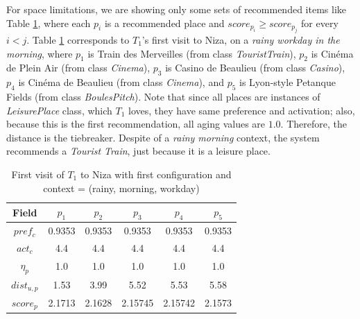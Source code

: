 

For space limitations, we are showing only some sets of recommended items like Table \ref{table:t1-1}, where each $p_i$ is a recommended place and $score_{p_i} \ge score_{p_j}$ for every $i < j$. Table \ref{table:t1-1} corresponds to $T_1$'s first visit to Niza, on a {\it rainy workday in the morning}, where $p_1$ is Train des Merveilles (from class \textit{TouristTrain}), $p_2$ is Cinéma de Plein Air (from class \textit{Cinema}), $p_3$ is Casino de Beaulieu (from class \textit{Casino}), $p_4$ is Cinéma de Beaulieu (from class \textit{Cinema}), and $p_5$ is Lyon-style Petanque Fields (from class \textit{BoulesPitch}). 
Note that since all places
are instances
of \textit{LeisurePlace} class, which $T_1$ loves, they have same preference and activation; also, because
this is the first recommendation, all aging values are $1.0$. Therefore, the distance is the tiebreaker. Despite of a {\it rainy morning} context, the system recommends a {\it Tourist Train}, 
just because it is a leisure place.

\begin{table}[h!]
\footnotesize{
    \centering
        \caption{First visit of $T_1$ to Niza with first configuration and context = (rainy, morning, workday)}
    \label{table:t1-1}
    \vspace{-0.2cm}
    \begin{tabular}{ |c|c|c|c|c|c| } 
        \hline
        Field   & $p_1$ & $p_2$ & $p_3$ & $p_4$ & $p_5$ \\
        \hline
        $pref_c$    &  0.9353 & 0.9353 & 0.9353 & 0.9353 & 0.9353 \\
        $act_c$     & 4.4 & 4.4 & 4.4 & 4.4 & 4.4 \\
        $\eta_p$    & 1.0 & 1.0 & 1.0 & 1.0 & 1.0 \\
        $dist_{u,p}$ & 1.53 & 3.99 & 5.52 & 5.53 & 5.58 \\
        $score_p$    & 2.1713 & 2.1628 & 2.15745 & 2.15742 & 2.1573 \\
        
        \hline
    \end{tabular}
    }
    \vspace{-0.3cm}
\end{table}


